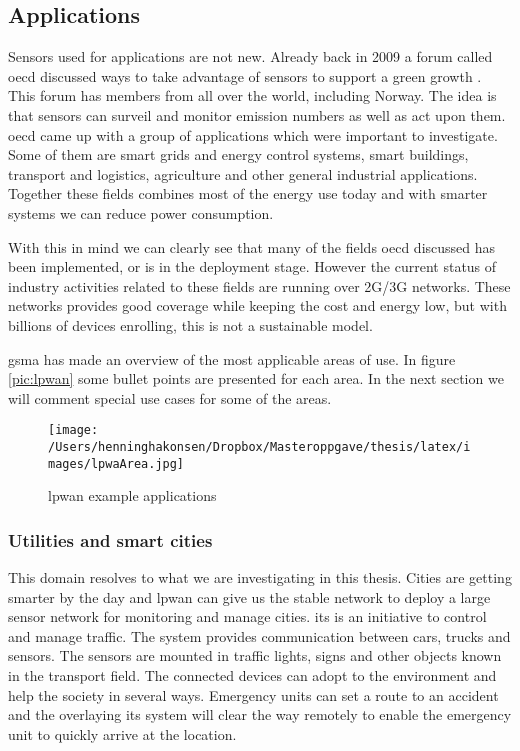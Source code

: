 \documentclass[USenglish]{ifimaster}  %
\begin{document}
\subsection{Applications} \label{ssection:applications}
Sensors used for applications are not new. Already back in 2009 a forum called \acrfull{oecd} discussed ways to take advantage of sensors to support a green growth \cite{online:industryApplications}. This forum has members from all over the world, including Norway. The idea is that sensors can surveil and monitor emission numbers as well as act upon them. \acrshort{oecd} came up with a group of applications which were important to investigate. Some of them are smart grids and energy control systems, smart buildings, transport and logistics, agriculture and other general industrial applications. Together these fields combines most of the energy use today and with smarter systems we can reduce power consumption.

With this in mind we can clearly see that many of the fields \acrshort{oecd} discussed has been implemented, or is in the deployment stage. However the current status of industry activities related to these fields are running over 2G/3G networks. These networks provides good coverage while keeping the cost and energy low, but with billions of devices enrolling, this is not a sustainable model.

\acrfull{gsma} has made an overview of the most applicable areas of use. In figure \vref{pic:lpwan} some bullet points are presented for each area. In the next section we will comment special use cases for some of the areas.

\begin{figure}[ht]
  \centering\texttt{[image: /Users/henninghakonsen/Dropbox/Masteroppgave/thesis/latex/images/lpwaArea.jpg]}
  \caption{\acrshort{lpwan} example applications \cite{online:lpwaFuture}}
  \label{pic:lpwan}
\end{figure}

\subsubsection{Utilities and smart cities}
This domain resolves to what we are investigating in this thesis. Cities are getting smarter by the day and \acrshort{lpwan} can give us the stable network to deploy a large sensor network for monitoring and manage cities. \acrfull{its} is an initiative to control and manage traffic. The system provides communication between cars, trucks and sensors. The sensors are mounted in traffic lights, signs and other objects known in the transport field. The connected devices can adopt to the environment and help the society in several ways. Emergency units can set a route to an accident and the overlaying \acrshort{its} system will clear the way remotely to enable the emergency unit to quickly arrive at the location.
\end{document}
